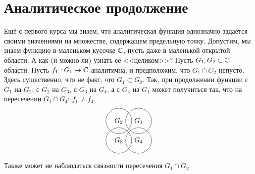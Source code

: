 \documentclass[a4paper]{report}
\begin{document}
    \section{Аналитическое продолжение}
    Ещё с первого курса мы знаем, что аналитическая функция однозначно задаётся своими значениями на множестве, содержащем предельную точку.
    Допустим, мы знаем функцию в маленьком кусочке $\mathbb{C}$, пусть даже в маленькой открытой области.
    А как (и можно ли) узнать её <<целиком>>?
    Пусть $G_1, G_2 \subset \mathbb{C}$ --- области.
    Пусть $f_1: G_1 \rightarrow \mathbb{C}$ аналитична, и предположим, что $G_1 \cap G_2$ непусто.
    Здесь существенно, что не факт, что $G_1 \subset G_2$.
    Так, при продолжении функции с $G_1$ на $G_2$, с $G_2$ на $G_3$, с $G_3$ на $G_4$, а с $G_4$ на $G_1$ может получиться так, что на пересечении $G_1 \cap G_4$: $f_1 \ne f_4$.
    \[\begin{tikzpicture}
        \draw (0.5, 0.5) circle (0.65) node {$G_1$};
        \draw (-0.5, 0.5) circle (0.65) node {$G_2$};
        \draw (-0.5, -0.5) circle (0.65) node {$G_3$};
        \draw (0.5, -0.5) circle (0.65) node {$G_4$};
    \end{tikzpicture}\]

    Также может не наблюдаться связности пересечения $G_1 \cap G_2$.
    
\end{document}
